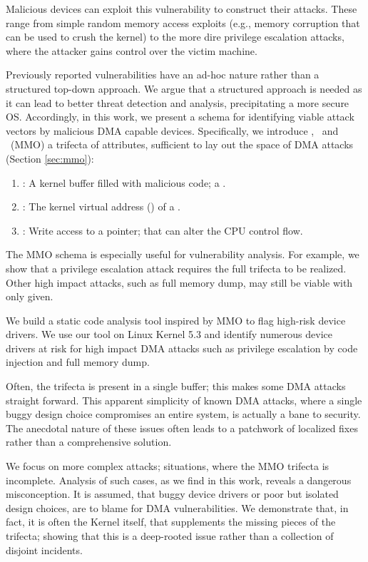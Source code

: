 Malicious devices can exploit this vulnerability to construct their attacks. These range from simple random memory access exploits (e.g., memory corruption that can be used to crush the kernel) to the more dire privilege escalation attacks, where the attacker gains control over the victim machine.

Previously reported vulnerabilities have an ad-hoc nature \cite{thunder,MMT16,Ben17b} rather than a structured top-down approach. We argue that a structured approach is needed as it can lead to better threat detection and analysis, precipitating a more secure OS. Accordingly, in this work, we present a schema for identifying viable attack vectors by malicious DMA capable devices. Specifically, we introduce \means,~\motivation{} and \oportunity~(MMO) a trifecta of attributes, sufficient to lay out the space of DMA attacks (Section \ref{sec:mmo}):
\begin{enumerate}
    \item \motivation: A kernel buffer filled with malicious code; a \mabaf.
    \item \means: The kernel virtual address (\kva) of a \mabaf.
    \item \oportunity: Write access to a pointer; that can alter the CPU control flow.
\end{enumerate} 

The MMO schema is especially useful for vulnerability analysis. For example, we show that a privilege escalation attack requires the full trifecta to be realized. Other high impact attacks, such as full memory dump, may still be viable with only \oportunity{} given. 

We build a static code analysis tool inspired by MMO to flag high-risk device drivers. We use our tool on Linux Kernel 5.3 and identify numerous device drivers at risk for high impact DMA attacks such as privilege escalation by code injection and full memory dump. 

Often, the trifecta is present in a single buffer; this makes some DMA attacks straight forward. This apparent simplicity of known DMA attacks, where a single buggy design choice compromises an entire system, is actually a bane to security. The anecdotal nature of these issues often leads to a patchwork of localized fixes rather than a comprehensive solution. 

We focus on more complex attacks; situations, where the MMO trifecta is incomplete. Analysis of such cases, as we find in this work, reveals a dangerous misconception. It is assumed, that buggy device drivers or poor but isolated design choices, are to blame for DMA vulnerabilities. We demonstrate that, in fact, it is often the Kernel itself, that supplements the missing pieces of the trifecta; showing that this is a deep-rooted issue rather than a collection of disjoint incidents.

